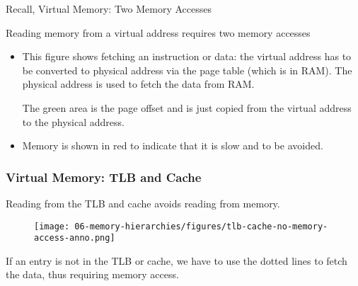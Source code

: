 


\newpage
\begin{frame}[fragile]{Recall, Virtual Memory: Two Memory Accesses}

Reading memory from a virtual address requires two memory accesses
\BNotes\ifnum{}
\begin{itemize}
\item This figure shows fetching an instruction or data: the virtual address
	has to be converted to physical address via the page table (which is
	in RAM).  The physical address is used to fetch the data from
	RAM.

	The green area is the page offset and is just copied from the virtual
	address to the physical address.
\item Memory is shown in red to indicate that it is slow and to be avoided.
\end{itemize}
\fi\ENotes
\end{frame}

\begin{frame}[fragile]\frametitle{Virtual Memory: TLB and Cache}
Reading from the TLB and cache avoids reading from memory.
\begin{figure}[H]
\centering
	{\texttt{[image: 06-memory-hierarchies/figures/tlb-cache-no-memory-access-anno.png]}}
\end{figure}
If an entry is not in the TLB or cache, we have to use the dotted lines to fetch the data, thus requiring memory access.
\end{frame}

